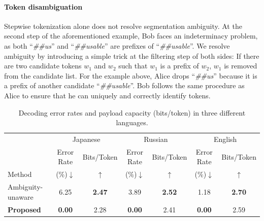 \documentclass[11pt]{article}
\begin{document}
\paragraph{Token disambiguation}
Stepwise tokenization alone does not resolve segmentation ambiguity.
At the second step of the aforementioned example, Bob faces an indeterminacy problem, as both ``\textit{\#\#us}'' and ``\textit{\#\#usable}'' are prefixes of ``\textit{\#\#usable}''.
We resolve ambiguity by introducing a simple trick at the filtering step of both sides:
If there are two candidate tokens $w_1$ and $w_2$ such that $w_1$ is a prefix of $w_2$, $w_1$ is removed from the candidate list.
For the example above, Alice drops ``\textit{\#\#us}'' because it is a prefix of another candidate ``\textit{\#\#usable}''.
Bob follows the same procedure as Alice to ensure that he can uniquely and correctly identify tokens.


\begin{table}[t]
\centering
\begin{tabular}{l|cc|cc|cc}
\hline
& \multicolumn{2}{c}{Japanese} & \multicolumn{2}{c}{Russian} & \multicolumn{2}{c}{English}  \\
& Error Rate & Bits/Token & Error Rate & Bits/Token & Error Rate & Bits/Token \\
Method & (\%)$\downarrow$ & $\uparrow$ & (\%)$\downarrow$ & $\uparrow$ & (\%)$\downarrow$ & $\uparrow$ \\
\hline
Ambiguity-unaware & 6.25 & \textbf{2.47} & 3.89 & \textbf{2.52} & 1.18 & \textbf{2.70}  \\
\textbf{Proposed} & \textbf{0.00} & 2.28 & \textbf{0.00} & 2.41 & \textbf{0.00} & 2.59 \\
\hline
\end{tabular}
\caption{Decoding error rates and payload capacity (bits/token) in three different languages.}
\label{tab:main}
\end{table}
\end{document}

